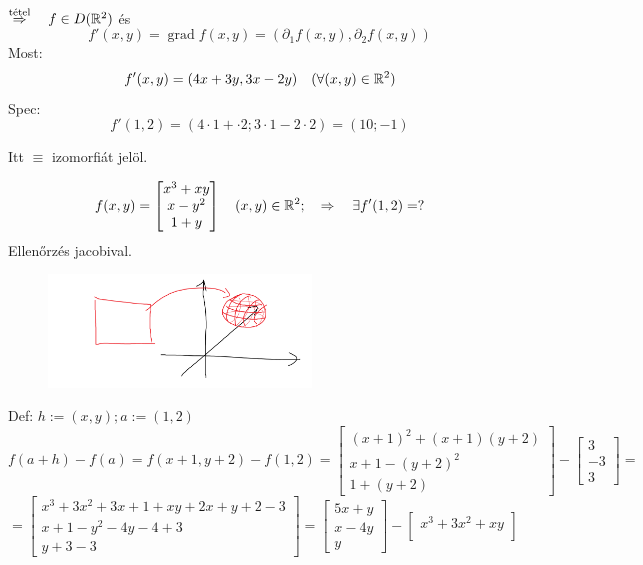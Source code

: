 \documentclass[a4paper,11.5pt]{article}
\DeclareMathOperator{\grad}{grad}
\begin{document}
\begin{task}
\begin{task}
\begin{revision}
				$\overset{\text{tétel}}{\Rightarrow}\quad f\in D(\mathbb{R}^2)$ és 
				\[ f'(x,y)=\grad f(x,y)=(\partial_1 f(x,y), \partial_2f(x,y)) \]
				Most:
				\[ f'(x,y)=(4x+3y,3x-2y)\quad (\forall(x,y)\in\mathbb{R}^2) \]
				Spec:
				\[ f'(1,2)=(4\cdot1+\cdot2;3\cdot1-2\cdot2)=(10;-1) \]
			\end{revision}
		\end{task}
		\begin{note}
			Itt $\equiv$ izomorfiát jelöl.
		\end{note}
		
		\begin{task}
			\[ f(x,y)=\begin{bmatrix}
				x^3+xy\\
				x-y^2\\
				1+y
			\end{bmatrix}\quad (x,y)\in\mathbb{R}^2;\quad \Rightarrow\quad \exists f'(1,2)=? \]
			Ellenőrzés jacobival.
			\begin{figure}[H]
				\centering
				\includegraphics[height=3cm]{kepek/29.png}
				\caption{}
			\end{figure}
			Def: $h:=(x,y); a:=(1,2)$
			\[ f(a+h)-f(a)=f(x+1,y+2)-f(1,2)=\begin{bmatrix}
				(x+1)^2+(x+1)(y+2)\\
				x+1-(y+2)^2\\
				1+(y+2)
			\end{bmatrix}-\begin{bmatrix}
				3\\
				-3\\
				3
			\end{bmatrix}=\]
			\[=\begin{bmatrix}
				x^3+3x^2+3x+1+xy+2x+y+2-3\\
				x+1-y^2-4y-4+3\\
				y+3-3
			\end{bmatrix}=\begin{bmatrix}
			5x+y\\
			x-4y\\
			y
			\end{bmatrix}-\begin{bmatrix}
				x^3+3x^2+xy\\

\end{bmatrix}\]
\end{task}
\end{task}
\end{document}
